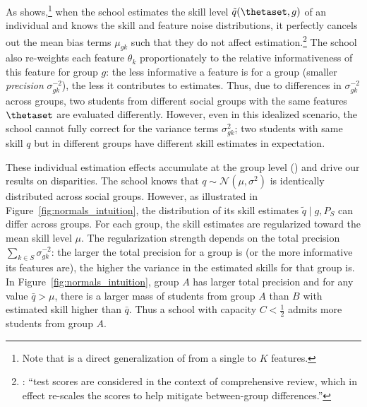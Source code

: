 As  shows,\footnote{Note that  is a direct generalization of \cite{phelps1972statistical} from a single to $K$ features.} when the school estimates the skill level $\tilde q (\thetaset, g)$ of an individual and knows the skill and feature noise distributions, it perfectly cancels out the mean bias terms $\mu_{gk}$ such that they do not affect estimation.\footnote{\cite{berkeleyreport}: ``test scores are considered in the context of comprehensive review, which in effect re-scales the scores to help mitigate between-group differences.''} {The school also re-weights each feature $\theta_k$ proportionately to the relative informativeness of this feature for group $g$:  the less informative a feature is for a group (smaller \textit{precision} $\sigma_{gk}^{-2}$), the less it contributes to estimates. Thus, due to differences in $\sigma_{gk}^{-2}$ across groups, two students from different social groups with the same features $\thetaset$ are evaluated differently. However, even in this idealized scenario, the school cannot fully correct for the variance terms $\sigma^2_{gk}$;
two students with same skill $q$ but in different groups have different skill estimates in expectation.}

These individual estimation effects accumulate at the group level () {and drive our results on disparities}. The school {knows} that $q \sim \mathcal{N}(\mu,\sigma^2)$ is identically distributed across social groups. However, as illustrated in Figure~\ref{fig:normals_intuition}, the distribution of its skill estimates ${\tilde q \mid  g, P_{S}}$
can differ across groups. For each group, the skill estimates are regularized toward the mean skill level $\mu$. The regularization strength depends on the total precision $\sum_{{k\in S}} \sigma_{gk}^{-2}$: the larger the total precision for a group is (or the more informative its features are), the higher the variance in the estimated skills for that group is.
In Figure~\ref{fig:normals_intuition}, group $A$ has larger total precision and for any value $\bar q>\mu$, there is a larger mass of students from group $A$ than $B$ with estimated skill higher than $\bar q$. Thus a school with capacity $C<\frac{1}{2}$ admits more students from group $A$.




